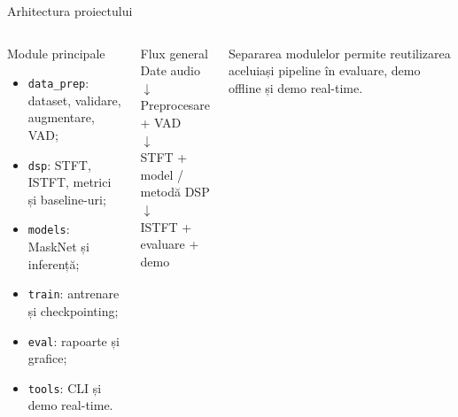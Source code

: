 \documentclass[aspectratio=169,11pt]{beamer}
\begin{document}
\begin{frame}{Arhitectura proiectului}
  \begin{columns}[T,onlytextwidth]
      \begin{block}{Module principale}
        \begin{itemize}
          \item \texttt{data\_prep}: dataset, validare, augmentare, VAD;
          \item \texttt{dsp}: STFT, ISTFT, metrici și baseline-uri;
          \item \texttt{models}: MaskNet și inferență;
          \item \texttt{train}: antrenare și checkpointing;
          \item \texttt{eval}: rapoarte și grafice;
          \item \texttt{tools}: CLI și demo real-time.
        \end{itemize}
      \end{block}

      \begin{block}{Flux general}
        \centering
        Date audio\\
        $\downarrow$\\
        Preprocesare + VAD\\
        $\downarrow$\\
        STFT + model / metodă DSP\\
        $\downarrow$\\
        ISTFT + evaluare + demo
      \end{block}
      \vspace{0.2cm}
      \small
      Separarea modulelor permite reutilizarea aceluiași pipeline în evaluare, demo offline și demo real-time.
  \end{columns}
\end{frame}
\end{document}
